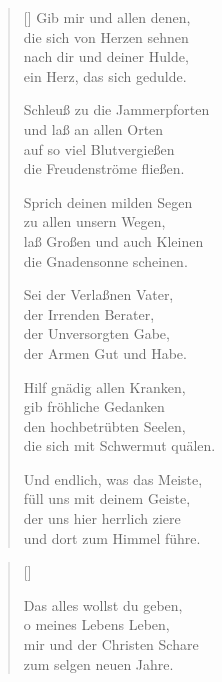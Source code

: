 \begin{multicols}{2}
\begin{verse}[\versewidth]
 Gib mir und allen denen,\\
die sich von Herzen sehnen\\
nach dir und deiner Hulde,\\
ein Herz, das sich gedulde.
 
 Schleuß zu die Jammerpforten\\
und laß an allen Orten\\
auf so viel Blutvergießen\\
die Freudenströme fließen.
 
 Sprich deinen milden Segen\\
zu allen unsern Wegen,\\
laß Großen und auch Kleinen\\
die Gnadensonne scheinen.
 
 Sei der Verlaßnen Vater,\\
der Irrenden Berater,\\
der Unversorgten Gabe,\\
der Armen Gut und Habe.
 
 Hilf gnädig allen Kranken,\\
gib fröhliche Gedanken\\
den hochbetrübten Seelen,\\
die sich mit Schwermut quälen.
 
 Und endlich, was das Meiste,\\
füll uns mit deinem Geiste,\\
der uns hier herrlich ziere\\
und dort zum Himmel führe.

\end{verse}
\end{multicols}

\begin{center}
\settowidth{\versewidth}{Der, vor dem die Welt erschrickt,}
\begin{verse}[\versewidth]

 Das alles wollst du geben,\\
o meines Lebens Leben,\\
mir und der Christen Schare\\
zum selgen neuen Jahre.
  
\end{verse}
\end{center}
